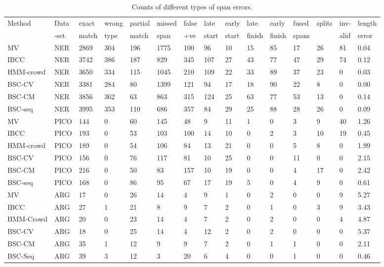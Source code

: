 \begin{table}[h]
\small
\centering
\setlength{\tabcolsep}{4pt}
\begin{tabular}{l l l l l l l l l l l l l l l }
\toprule
Method & Data & exact & wrong & partial  & missed  & false & late & early & late & early & fused & splits & inv- &  length \\ 
 & -set & match & type & match & span & +ve & start & start & finish & finish & spans &  & alid & error \\
\midrule
MV & NER & 2869 & 304 & 196 & 1775 & 100 & 96 & 10 & 15 & 85 & 17 & 26 & 81 & 0.04 \\
IBCC & NER & 3742 & 386 & 187 & 829 & 345 & 107 & 27 & 43 & 77 & 47 & 29 & 74 & 0.12 \\
HMM-crowd & NER & 3650 & 334 & 115 & 1045 & 210 & 109 & 22 & 33 & 89 & 37 & 23 & 0 & 0.03 \\
BSC-CV & NER & 3381 & 284 & 80 & 1399 & 121 & 94 & 17 & 18 & 90 & 22 & 8 & 0 & 0.00 \\
BSC-CM & NER & 3856 & 362 & 63 & 863 & 315 & 124 & 25 & 63 & 77 & 53 & 13 & 0 & 0.14 \\
BSC-seq & NER & 3995 & 353 & 110 & 686 & 357 &  84 &  29 &  25 &  88 &  28 &  26 & 0 & 0.09 \\
\midrule 
MV & PICO  & 144 & 0 & 60 & 145 & 48 & 9 & 11 & 1 & 0 & 3 & 9 & 40 & 1.26 \\
IBCC & PICO & 193 & 0 & 53 & 103 & 100 & 14 & 10 & 0 & 2 & 3 & 10 & 19 & 0.45 \\
HMM-crowd& PICO & 189 & 0 & 54 & 106 & 84 & 13 & 21 & 0 & 0 & 5 & 8 & 0 & 1.99 \\
BSC-CV     & PICO & 156 & 0 & 76 & 117 & 81 & 10 & 25 & 0 & 0 & 11 & 0 & 0 & 2.15 \\
BSC-CM     & PICO & 216 & 0 & 50 & 83 & 157 & 10 & 19 & 0 & 0 & 4 & 17 & 0 & 2.42\\
BSC-seq    & PICO & 168 & 0 & 86 & 95 & 67 & 17 & 19 & 5 & 0 & 4 & 9 & 0 & 0.61 \\
\midrule 
MV & ARG & 17 &  0 & 26 & 14 &  4  &  9 & 1 &  0 & 2 &  0 &  0 & 9 & 5.27 \\
IBCC & ARG & 27 & 1 & 21 & 8 & 9 & 7 & 2 & 0 & 1 & 0 & 3 & 9 & 3.43 \\
HMM-Crowd & ARG & 20 & 0 & 23 & 14 & 4 & 7 & 2 & 0 & 2 & 0 & 0 & 4 & 4.87 \\
BSC-CV & ARG & 18 & 0 & 25 & 14 & 4 & 12 & 2 & 0 & 2 & 0 & 0 & 0 & 5.37 \\
BSC-CM & ARG & 35 & 1 & 12 & 9 & 9 & 7 & 2 & 0 & 1 & 1 & 0 & 0 & 2.11 \\
BSC-Seq & ARG & 39 & 3 & 12 & 3 & 20 & 6 & 4 & 0 & 0 & 1 & 0 & 0 & 0.46 \\
\bottomrule
\end{tabular}
\caption{Counts of different types of span errors.}
\label{tab:error_analysis}
\end{table}
